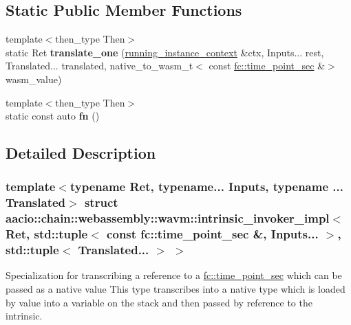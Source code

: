 \subsection*{Static Public Member Functions}
\begin{DoxyCompactItemize}
\item 
\mbox{\label{structaacio_1_1chain_1_1webassembly_1_1wavm_1_1intrinsic__invoker__impl_3_01_ret_00_01std_1_1tupe6f57535d094413488c9390cb89311e5_a05643698c6b337ec01b49e9da1d37917}} 
{\footnotesize template$<$then\+\_\+type Then$>$ }\\static Ret {\bfseries translate\+\_\+one} (\mbox{\hyperlink{structaacio_1_1chain_1_1webassembly_1_1wavm_1_1running__instance__context}{running\+\_\+instance\+\_\+context}} \&ctx, Inputs... rest, Translated... translated, native\+\_\+to\+\_\+wasm\+\_\+t$<$ const \mbox{\hyperlink{classfc_1_1time__point__sec}{fc\+::time\+\_\+point\+\_\+sec}} \&$>$ wasm\+\_\+value)
\item 
\mbox{\label{structaacio_1_1chain_1_1webassembly_1_1wavm_1_1intrinsic__invoker__impl_3_01_ret_00_01std_1_1tupe6f57535d094413488c9390cb89311e5_af87f694cc35c6733d864e3edee9361a6}} 
{\footnotesize template$<$then\+\_\+type Then$>$ }\\static const auto {\bfseries fn} ()
\end{DoxyCompactItemize}


\subsection{Detailed Description}
\subsubsection*{template$<$typename Ret, typename... Inputs, typename ... Translated$>$\newline
struct aacio\+::chain\+::webassembly\+::wavm\+::intrinsic\+\_\+invoker\+\_\+impl$<$ Ret, std\+::tuple$<$ const fc\+::time\+\_\+point\+\_\+sec \&, Inputs... $>$, std\+::tuple$<$ Translated... $>$ $>$}

Specialization for transcribing a reference to a \mbox{\hyperlink{classfc_1_1time__point__sec}{fc\+::time\+\_\+point\+\_\+sec}} which can be passed as a native value This type transcribes into a native type which is loaded by value into a variable on the stack and then passed by reference to the intrinsic.


